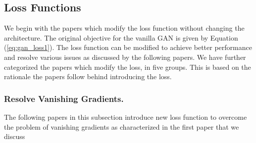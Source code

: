 \subsection{Loss Functions}
\label{subsec:loss}
We begin with the papers which modify the loss function  without changing the architecture. The original objective for the vanilla GAN is given by Equation (\ref{eq:gan_loss1}). The loss function can be modified to achieve better performance and resolve various issues as discussed by the following papers. We have further categorized the papers which modify the loss, in five groups. This is based on the rationale the papers follow behind introducing the loss.





\subsubsection{Resolve Vanishing Gradients.} \label{subsubsec:loss_vg} The following  papers in this subsection introduce new loss function to overcome the problem of vanishing gradients as characterized in the first paper that we discuss \citep{arjovsky01} 



